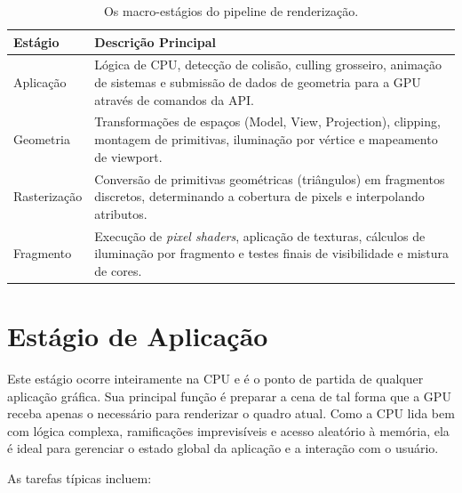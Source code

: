 \begin{table}[H]
\centering
\begin{tabularx}{\textwidth}{l|X}
\toprule
\textbf{Estágio} & \textbf{Descrição Principal} \\
\midrule
Aplicação & Lógica de CPU, detecção de colisão, culling grosseiro, animação de sistemas e submissão de dados de geometria para a GPU através de comandos da API. \\
Geometria & Transformações de espaços (Model, View, Projection), clipping, montagem de primitivas, iluminação por vértice e mapeamento de viewport. \\
Rasterização & Conversão de primitivas geométricas (triângulos) em fragmentos discretos, determinando a cobertura de pixels e interpolando atributos. \\
Fragmento & Execução de \textit{pixel shaders}, aplicação de texturas, cálculos de iluminação por fragmento e testes finais de visibilidade e mistura de cores. \\
\bottomrule
\end{tabularx}
\caption{Os macro-estágios do pipeline de renderização.}
\end{table}

\section{Estágio de Aplicação}

Este estágio ocorre inteiramente na CPU e é o ponto de partida de qualquer aplicação gráfica. Sua principal função é preparar a cena de tal forma que a GPU receba apenas o necessário para renderizar o quadro atual. Como a CPU lida bem com lógica complexa, ramificações imprevisíveis e acesso aleatório à memória, ela é ideal para gerenciar o estado global da aplicação e a interação com o usuário.

As tarefas típicas incluem:


